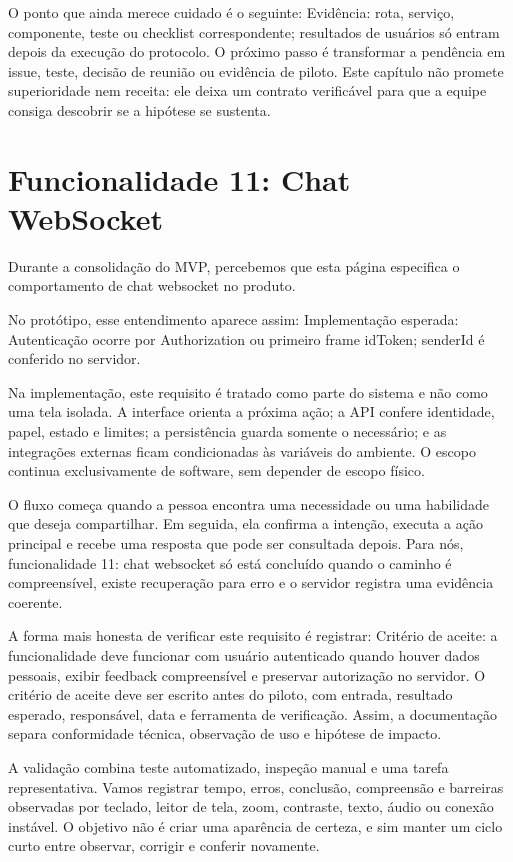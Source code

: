 \documentclass[12pt,oneside,a4paper,article]{abntex2}
\begin{document}
O ponto que ainda merece cuidado é o seguinte: Evidência: rota, serviço, componente, teste ou checklist correspondente; resultados de usuários só entram depois da execução do protocolo. O próximo passo é transformar a pendência em issue, teste, decisão de reunião ou evidência de piloto. Este capítulo não promete superioridade nem receita: ele deixa um contrato verificável para que a equipe consiga descobrir se a hipótese se sustenta.

\section{Funcionalidade 11: Chat WebSocket}
Durante a consolidação do MVP, percebemos que esta página especifica o comportamento de chat websocket no produto.

No protótipo, esse entendimento aparece assim: Implementação esperada: Autenticação ocorre por Authorization ou primeiro frame idToken; senderId é conferido no servidor.

Na implementação, este requisito é tratado como parte do sistema e não como uma tela isolada. A interface orienta a próxima ação; a API confere identidade, papel, estado e limites; a persistência guarda somente o necessário; e as integrações externas ficam condicionadas às variáveis do ambiente. O escopo continua exclusivamente de software, sem depender de escopo físico.

O fluxo começa quando a pessoa encontra uma necessidade ou uma habilidade que deseja compartilhar. Em seguida, ela confirma a intenção, executa a ação principal e recebe uma resposta que pode ser consultada depois. Para nós, funcionalidade 11: chat websocket só está concluído quando o caminho é compreensível, existe recuperação para erro e o servidor registra uma evidência coerente.

A forma mais honesta de verificar este requisito é registrar: Critério de aceite: a funcionalidade deve funcionar com usuário autenticado quando houver dados pessoais, exibir feedback compreensível e preservar autorização no servidor. O critério de aceite deve ser escrito antes do piloto, com entrada, resultado esperado, responsável, data e ferramenta de verificação. Assim, a documentação separa conformidade técnica, observação de uso e hipótese de impacto.

A validação combina teste automatizado, inspeção manual e uma tarefa representativa. Vamos registrar tempo, erros, conclusão, compreensão e barreiras observadas por teclado, leitor de tela, zoom, contraste, texto, áudio ou conexão instável. O objetivo não é criar uma aparência de certeza, e sim manter um ciclo curto entre observar, corrigir e conferir novamente.
\end{document}
